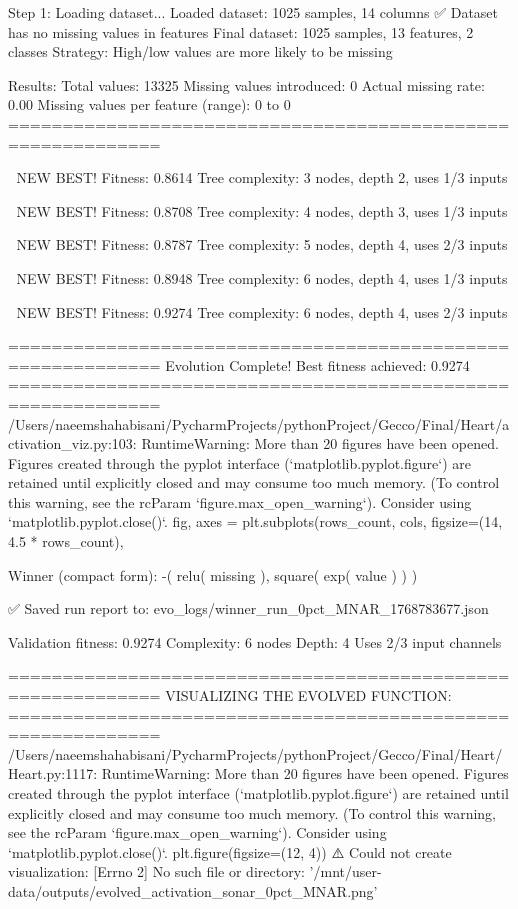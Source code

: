 Step 1: Loading dataset...
Loaded dataset: 1025 samples, 14 columns
✅ Dataset has no missing values in features
Final dataset: 1025 samples, 13 features, 2 classes
Strategy: High/low values are more likely to be missing

Results:
  Total values: 13325
  Missing values introduced: 0
  Actual missing rate: 0.00%
  Missing values per feature (range): 0 to 0
============================================================


🎯 NEW BEST! Fitness: 0.8614
Tree complexity: 3 nodes, depth 2, uses 1/3 inputs

🎯 NEW BEST! Fitness: 0.8708
Tree complexity: 4 nodes, depth 3, uses 1/3 inputs

🎯 NEW BEST! Fitness: 0.8787
Tree complexity: 5 nodes, depth 4, uses 2/3 inputs

🎯 NEW BEST! Fitness: 0.8948
Tree complexity: 6 nodes, depth 4, uses 1/3 inputs

🎯 NEW BEST! Fitness: 0.9274
Tree complexity: 6 nodes, depth 4, uses 2/3 inputs

============================================================
Evolution Complete!
Best fitness achieved: 0.9274
============================================================
/Users/naeemshahabisani/PycharmProjects/pythonProject/Gecco/Final/Heart/activation_viz.py:103: RuntimeWarning: More than 20 figures have been opened. Figures created through the pyplot interface (`matplotlib.pyplot.figure`) are retained until explicitly closed and may consume too much memory. (To control this warning, see the rcParam `figure.max_open_warning`). Consider using `matplotlib.pyplot.close()`.
  fig, axes = plt.subplots(rows_count, cols, figsize=(14, 4.5 * rows_count),

Winner (compact form):
 -(
  relu(
    missing
  ),
  square(
    exp(
      value
    )
  )
)

✅ Saved run report to: evo_logs/winner_run_0pct_MNAR_1768783677.json

Validation fitness: 0.9274
Complexity: 6 nodes
Depth: 4
Uses 2/3 input channels

============================================================
VISUALIZING THE EVOLVED FUNCTION:
============================================================
/Users/naeemshahabisani/PycharmProjects/pythonProject/Gecco/Final/Heart/Heart.py:1117: RuntimeWarning: More than 20 figures have been opened. Figures created through the pyplot interface (`matplotlib.pyplot.figure`) are retained until explicitly closed and may consume too much memory. (To control this warning, see the rcParam `figure.max_open_warning`). Consider using `matplotlib.pyplot.close()`.
  plt.figure(figsize=(12, 4))
⚠️ Could not create visualization: [Errno 2] No such file or directory: '/mnt/user-data/outputs/evolved_activation_sonar_0pct_MNAR.png'

